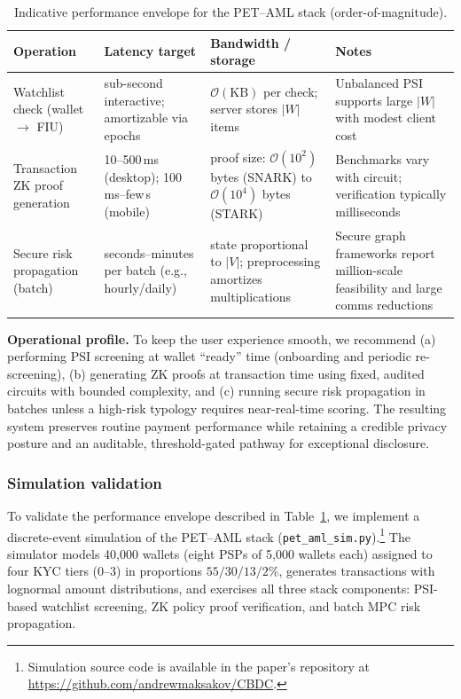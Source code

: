 \documentclass[11pt]{article}
\begin{document}
\begin{table}[H]
\centering
\caption{Indicative performance envelope for the PET--AML stack (order-of-magnitude).}
\label{tab:pet-aml-envelope}
\begin{tabular}{p{3.2cm} p{3.0cm} p{3.4cm} p{4.2cm}}
\toprule
\textbf{Operation} & \textbf{Latency target} & \textbf{Bandwidth / storage} & \textbf{Notes} \\
\midrule
Watchlist check (wallet $\rightarrow$ FIU) & sub-second interactive; amortizable via epochs & $\mathcal{O}(\text{KB})$ per check; server stores $|W|$ items & Unbalanced PSI supports large $|W|$ with modest client cost \citep{Wang2025UnbalancedPSI} \\
\addlinespace
Transaction ZK proof generation & 10--500\,ms (desktop); 100\,ms--few\,s (mobile) & proof size: $\mathcal{O}(10^2)$ bytes (SNARK) to $\mathcal{O}(10^4)$ bytes (STARK) & Benchmarks vary with circuit; verification typically milliseconds \citep{ElHajj2024ZKBench} \\
\addlinespace
Secure risk propagation (batch) & seconds--minutes per batch (e.g., hourly/daily) & state proportional to $|V|$; preprocessing amortizes multiplications & Secure graph frameworks report million-scale feasibility and large comms reductions \citep{Koti2024Graphiti,Yu2025GraphAce} \\
\bottomrule
\end{tabular}
\end{table}

\textbf{Operational profile.} To keep the user experience smooth, we recommend (a) performing PSI screening at wallet ``ready'' time (onboarding and periodic re-screening), (b) generating ZK proofs at transaction time using fixed, audited circuits with bounded complexity, and (c) running secure risk propagation in batches unless a high-risk typology requires near-real-time scoring. The resulting system preserves routine payment performance while retaining a credible privacy posture and an auditable, threshold-gated pathway for exceptional disclosure.

\subsubsection{Simulation validation}
\label{sec:pet-aml-simulation}

To validate the performance envelope described in Table~\ref{tab:pet-aml-envelope}, we implement a discrete-event simulation of the PET--AML stack (\texttt{pet\_aml\_sim.py}).\footnote{Simulation source code is available in the paper's repository at \url{https://github.com/andrewmaksakov/CBDC}.} The simulator models 40{,}000 wallets (eight PSPs of 5{,}000 wallets each) assigned to four KYC tiers (0--3) in proportions $55/30/13/2\%$, generates transactions with lognormal amount distributions, and exercises all three stack components: PSI-based watchlist screening, ZK policy proof verification, and batch MPC risk propagation.
\end{document}
